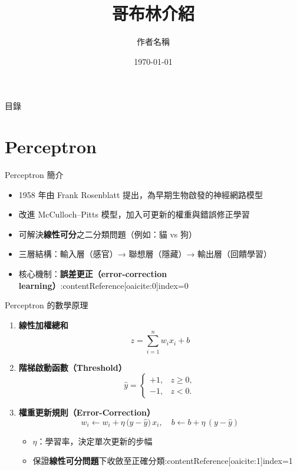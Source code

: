 \documentclass{beamer}
\title{哥布林介紹}
\author{作者名稱}
\date{\today}
\begin{document}
\begin{frame}
    \titlepage
\end{frame}

\begin{frame}{目錄}
    \tableofcontents
\end{frame}

\section{Perceptron}
\begin{frame}{Perceptron 簡介}
\begin{itemize}
  \item 1958 年由 Frank Rosenblatt 提出，為早期生物啟發的神經網路模型  
  \item 改進 McCulloch–Pitts 模型，加入\alert{可更新的權重}與\alert{錯誤修正學習}  
  \item 可解決\textbf{線性可分}之二分類問題（例如：貓 vs 狗）  
  \item 三層結構：輸入層（感官）→ 聯想層（隱藏）→ 輸出層（回饋學習）  
  \item 核心機制：\textbf{誤差更正（error-correction learning）}:contentReference[oaicite:0]{index=0}
\end{itemize}
\end{frame}

\begin{frame}{Perceptron 的數學原理}
\begin{enumerate}
  \item \textbf{線性加權總和}
  \[
    z = \sum_{i=1}^{n} w_i x_i + b
  \]
  \item \textbf{階梯啟動函數（Threshold）}
  \[
    \hat{y} =
    \begin{cases}
      +1, & z \ge 0,\\
      -1, & z < 0.
    \end{cases}
  \]
  \item \textbf{權重更新規則（Error-Correction）}
  \[
    w_i \leftarrow w_i + \eta\,\bigl(y - \hat{y}\bigr)\,x_i,
    \quad
    b \leftarrow b + \eta\,(y - \hat{y})
  \]
  \begin{itemize}
    \item $\eta$：學習率，決定單次更新的步幅  
    \item 保證\textbf{線性可分問題}下收斂至正確分類:contentReference[oaicite:1]{index=1}
  \end{itemize}
\end{enumerate}
\end{frame}
\end{document}
